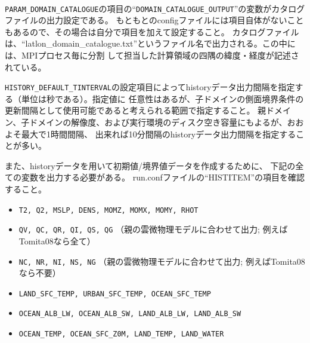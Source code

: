 \\

\verb|PARAM_DOMAIN_CATALOGUE|の項目の``\verb|DOMAIN_CATALOGUE_OUTPUT|''の変数がカタログファイルの出力設定である。
もともとのconfigファイルには項目自体がないこともあるので、その場合は自分で項目を加えて設定すること。
カタログファイルは、``latlon\_domain\_catalogue.txt''というファイル名で出力される。この中には、MPIプロセス毎に分割
して担当した計算領域の四隅の緯度・経度が記述されている。

\verb|HISTORY_DEFAULT_TINTERVAL|の設定項目によってhistoryデータ出力間隔を指定する（単位は秒である）。指定値に
任意性はあるが、子ドメインの側面境界条件の更新間隔として使用可能であると考えられる範囲で指定すること。
親ドメイン、子ドメインの解像度、および実行環境のディスク空き容量にもよるが、おおよそ最大で1時間間隔、
出来れば10分間隔のhistoryデータ出力間隔を指定することが多い。

また、historyデータを用いて初期値/境界値データを作成するために、
下記の全ての変数を出力する必要がある。
run.confファイルの``HISTITEM''の項目を確認すること。

\begin{itemize}
 \item \verb|T2, Q2, MSLP, DENS, MOMZ, MOMX, MOMY, RHOT|
 \item \verb|QV, QC, QR, QI, QS, QG| {\small （親の雲微物理モデルに合わせて出力; 例えばTomita08なら全て）}
 \item \verb|NC, NR, NI, NS, NG| {\small （親の雲微物理モデルに合わせて出力; 例えばTomita08なら不要）}
 \item \verb|LAND_SFC_TEMP, URBAN_SFC_TEMP, OCEAN_SFC_TEMP|
 \item \verb|OCEAN_ALB_LW, OCEAN_ALB_SW, LAND_ALB_LW, LAND_ALB_SW|
 \item \verb|OCEAN_TEMP, OCEAN_SFC_Z0M, LAND_TEMP, LAND_WATER|
\end{itemize}

